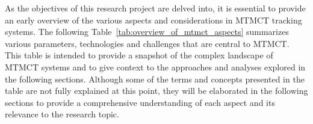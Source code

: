 As the objectives of this research project are delved into, it is essential to provide an early overview of the various aspects and considerations in MTMCT tracking systems. The following Table~\ref{tab:overview_of_mtmct_aspects} summarizes various parameters, technologies and challenges that are central to MTMCT. This table is intended to provide a snapshot of the complex landscape of MTMCT systems and to give context to the approaches and analyses explored in the following sections. Although some of the terms and concepts presented in the table are not fully explained at this point, they will be elaborated in the following sections to provide a comprehensive understanding of each aspect and its relevance to the research topic.

\begin{table}[ht]
    \centering
    \caption{Overview of MTMCT Aspects}\label{tab:overview_of_mtmct_aspects}
\end{table}
